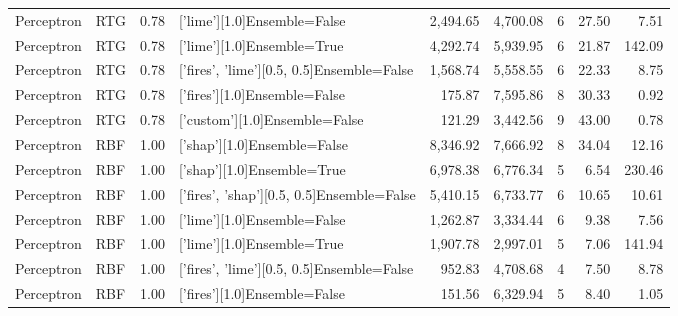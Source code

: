 \begin{tabular}{llrlrrlrr}
         Perceptron &            RTG &      0.78 &               ['lime'][1.0]Ensemble=False &   2,494.65 &                 4,700.08 &               6 &              27.50 &   7.51 \\
         Perceptron &            RTG &      0.78 &                ['lime'][1.0]Ensemble=True &   4,292.74 &                 5,939.95 &               6 &              21.87 & 142.09 \\
         Perceptron &            RTG &      0.78 & ['fires', 'lime'][0.5, 0.5]Ensemble=False &   1,568.74 &                 5,558.55 &               6 &              22.33 &   8.75 \\
         Perceptron &            RTG &      0.78 &              ['fires'][1.0]Ensemble=False &     175.87 &                 7,595.86 &               8 &              30.33 &   0.92 \\
         Perceptron &            RTG &      0.78 &             ['custom'][1.0]Ensemble=False &     121.29 &                 3,442.56 &               9 &              43.00 &   0.78 \\
         Perceptron &            RBF &      1.00 &               ['shap'][1.0]Ensemble=False &   8,346.92 &                 7,666.92 &               8 &              34.04 &  12.16 \\
         Perceptron &            RBF &      1.00 &                ['shap'][1.0]Ensemble=True &   6,978.38 &                 6,776.34 &               5 &               6.54 & 230.46 \\
         Perceptron &            RBF &      1.00 & ['fires', 'shap'][0.5, 0.5]Ensemble=False &   5,410.15 &                 6,733.77 &               6 &              10.65 &  10.61 \\
         Perceptron &            RBF &      1.00 &               ['lime'][1.0]Ensemble=False &   1,262.87 &                 3,334.44 &               6 &               9.38 &   7.56 \\
         Perceptron &            RBF &      1.00 &                ['lime'][1.0]Ensemble=True &   1,907.78 &                 2,997.01 &               5 &               7.06 & 141.94 \\
         Perceptron &            RBF &      1.00 & ['fires', 'lime'][0.5, 0.5]Ensemble=False &     952.83 &                 4,708.68 &               4 &               7.50 &   8.78 \\
         Perceptron &            RBF &      1.00 &              ['fires'][1.0]Ensemble=False &     151.56 &                 6,329.94 &               5 &               8.40 &   1.05 \\

\end{tabular}
